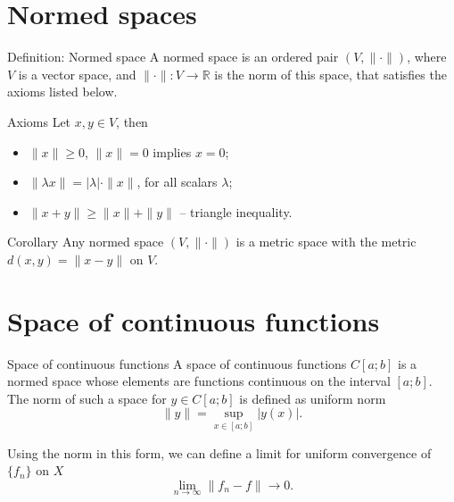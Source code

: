 \documentclass[10pt]{beamer}
\begin{document}
\section{Normed spaces}
\begin{frame}
  \begin{block}{Definition: Normed space}
    A normed space is an ordered pair \((V, \| \cdot \|)\), where \(V\) is a vector space,
    and \(\| \cdot \|:V \rightarrow \mathbb{R}\) is the norm of this space, that satisfies
    the axioms listed below.
  \end{block}

  \begin{alertblock}{Axioms}
    Let \(x, y \in V\), then
    \begin{itemize}
      \item \(\|x\| \ge 0\), \(\|x\| = 0\) implies \(x = 0\);
      \item \(\| \lambda x \| = |\lambda| \cdot \|x\|\), for all scalars \(\lambda\);
      \item \(\|x + y\| \ge \|x\| + \|y\|\) -- triangle inequality.
    \end{itemize}
  \end{alertblock}

  \begin{exampleblock}{Corollary}
    Any normed space \((V, \| \cdot \|)\) is a metric space with the metric
    \(d(x, y) = \| x - y \|\) on \(V\).
  \end{exampleblock}
\end{frame}

\section{Space of continuous functions}
\begin{frame}
  \begin{block}{Space of continuous functions}
    A space of continuous functions \(C[a;b]\) is a normed space whose elements are
    functions continuous on the interval \([a;b]\). The norm of such a space for \(y \in C[a;b]\) is defined as
    uniform norm
    \[\|y\| = \sup_{x \in [a;b]}|y(x)|.\]
  \end{block}
  Using the norm in this form, we can define a limit for uniform convergence of \(\{f_n\}\) on \(X\)
  \[\lim_{n \rightarrow \infty} \|f_n - f\| \rightarrow 0.\]
\end{frame}
\end{document}
